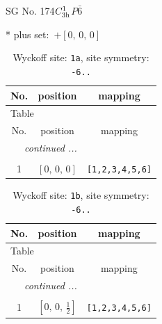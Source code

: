\documentclass[fleqn,8pt]{jsarticle}
\begin{document}
\setcounter{MaxMatrixCols}{32}

\renewcommand{\tablename}{Table~}
\renewcommand{\figurename}{Figure~}
\begin{center}
\LARGE
SG No. 174\quad$C_{\rm 3h}^{1}$\quad$P\bar{6}$\quad[ hexagonal ]
\end{center}
* plus set:\,\,\,$+\left[ 0,\, 0,\, 0 \right]$
\renewcommand{\arraystretch}{1.2}
\begin{longtable}{ccc}
\caption{Wyckoff site: {\tt 1a}, site symmetry: {\tt -6..}}
 \\
 \hline \hline
No. & position & mapping \\ \hline \endfirsthead

\multicolumn{2}{l}{\tablename\ \thetable{}} \\
 \hline \hline
No. & position & mapping \\ \hline \endhead

 \hline \hline
\multicolumn{2}{r}{\footnotesize\it continued ...} \\ \endfoot

 \hline \hline
\multicolumn{2}{r}{} \\ \endlastfoot

1 & $\left[ 0,\, 0,\, 0 \right]$ & {\tt [1,2,3,4,5,6]} \\
\end{longtable}
\renewcommand{\arraystretch}{1.2}
\begin{longtable}{ccc}
\caption{Wyckoff site: {\tt 1b}, site symmetry: {\tt -6..}}
 \\
 \hline \hline
No. & position & mapping \\ \hline \endfirsthead

\multicolumn{2}{l}{\tablename\ \thetable{}} \\
 \hline \hline
No. & position & mapping \\ \hline \endhead

 \hline \hline
\multicolumn{2}{r}{\footnotesize\it continued ...} \\ \endfoot

 \hline \hline
\multicolumn{2}{r}{} \\ \endlastfoot

1 & $\left[ 0,\, 0,\, \frac{1}{2} \right]$ & {\tt [1,2,3,4,5,6]} \\
\end{longtable}
\renewcommand{\arraystretch}{1.2}
\end{document}

